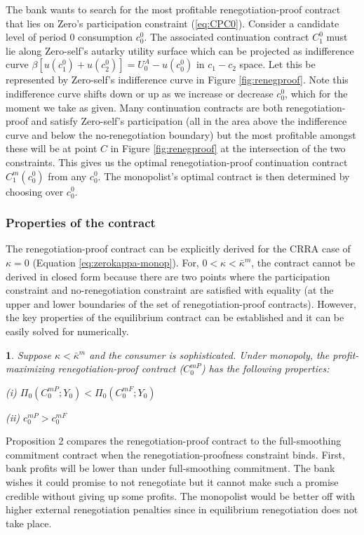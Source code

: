 \documentclass[11pt,english]{article}
\theoremstyle{plain}
\newtheorem{prop}{\protect\propositionname}
\theoremstyle{definition}
\providecommand{\propositionname}{Proposition}
\begin{document}
The bank wants to search for the most profitable renegotiation-proof
contract that lies on Zero's participation constraint (\ref{eq:CPC0}).
Consider a candidate level of period 0 consumption $c_{0}^{0}$. The
associated continuation contract $C_{1}^{0}$ must lie along Zero-self's
autarky utility surface which can be projected as indifference curve
$\beta\left[u(c_{1}^{0})+u(c_{2}^{0})\right]=U_{0}^{A}-u(c_{0}^{0})$
in $c_{1}-c_{2}$ space. Let this be represented by Zero-self's indifference
curve in Figure \ref{fig:renegproof}. Note this indifference curve
shifts down or up as we increase or decrease $c_{0}^{0}$, which for
the moment we take as given. Many continuation contracts are both
renegotiation-proof and satisfy Zero-self's participation (all in
the area above the indifference curve and below the no-renegotiation
boundary) but the most profitable amongst these will be at point $C$
in Figure \ref{fig:renegproof} at the intersection of the two constraints.
This gives us the optimal renegotiation-proof continuation contract
$C_{1}^{m}(c_{0}^{0})$ from any $c_{0}^{0}$. The monopolist's optimal
contract is then determined by choosing over $c_{0}^{0}$.

\subsubsection{Properties of the contract}

\label{sec_contract_properties}

The renegotiation-proof contract can be explicitly derived for the
CRRA case of $\kappa=0$ (Equation \ref{eq:zerokappa-monop}). For,
$0<\kappa<\bar{\kappa}^{m}$, the contract cannot be derived in closed
form because there are two points where the participation constraint
and no-renegotiation constraint are satisfied with equality (at the
upper and lower boundaries of the set of renegotiation-proof contracts).
However, the key properties of the equilibrium contract can be established
and it can be easily solved for numerically.
\begin{prop}
Suppose $\kappa<\bar{\kappa}^{m}$ and the consumer is sophisticated.
Under monopoly, the profit-maximizing renegotiation-proof contract
($C_{0}^{mP}$) has the following properties:

(i) $\Pi_{0}\left(C_{0}^{mP};Y_{0}\right)<\Pi_{0}\left(C_{0}^{mF};Y_{0}\right)$

(ii) $c_{0}^{mP}>c_{0}^{mF}$ 
\end{prop}
Proposition 2 compares the renegotiation-proof contract to the full-smoothing
commitment contract when the renegotiation-proofness constraint binds.
First, bank profits will be lower than under full-smoothing commitment.
The bank wishes it could promise to not renegotiate but it cannot
make such a promise credible without giving up some profits. The monopolist
would be better off with higher external renegotiation penalties since
in equilibrium renegotiation does not take place.
\end{document}

